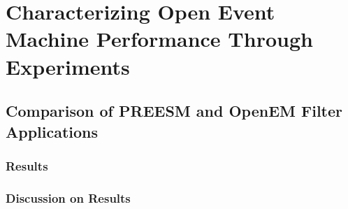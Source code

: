 \chapter [OpenEM Experiments] {Characterizing Open Event Machine Performance Through Experiments}
\label{chapter:experiments}


\section{Comparison of PREESM and OpenEM Filter Applications}
\label{sec:firstexperiment}


\subsection{Results}


\subsection{Discussion on Results}

